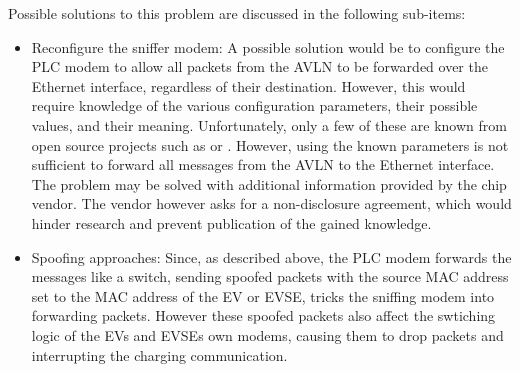 \documentclass[sigconf]{acmart}
\begin{document}
Possible solutions to this problem are discussed in the following sub-items:

\begin{itemize}
    \item Reconfigure the sniffer modem: A possible solution would be to configure the PLC modem to allow all packets from the AVLN to be forwarded over the Ethernet interface, regardless of their destination. However, this would require knowledge of the various configuration parameters, their possible values, and their meaning. Unfortunately, only a few of these are known from open source projects such as \citep{fluxiushomeplugpwn} or \citep{qcaopen-plc-utils}. However, using the known parameters is not sufficient to forward all messages from the AVLN to the Ethernet interface. The problem may be solved with additional information provided by the chip vendor. The vendor however asks for a non-disclosure agreement, which would hinder research and prevent publication of the gained knowledge.
    \item Spoofing approaches: Since, as described above, the PLC modem forwards the messages like a switch, sending spoofed packets with the source MAC address set to the MAC address of the EV or EVSE, tricks the sniffing modem into forwarding packets. However these spoofed packets also affect the swtiching logic of the EVs and EVSEs own modems, causing them to drop packets and interrupting the charging communication.

\end{itemize}
\end{document}

